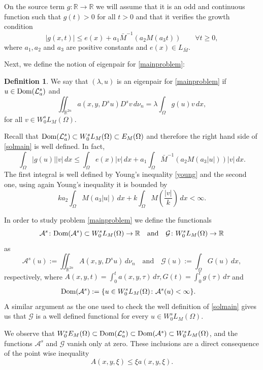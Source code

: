 \documentclass{amsart}
\def\Dom{\text{\normalfont Dom}}
\newcommand{\A}{\mathcal{L}_a^s}
\newcommand{\R}{{\mathbb R}}
\newcommand{\EE}{{\mathcal A}^s}
\newcommand{\G}{{\mathcal G}}
\theoremstyle{remark}
\theoremstyle{definition}
\newtheorem{defi}[teo]{Definition}
\numberwithin{equation}{section}
\begin{document}
On the source term $g\colon \R\to \R$ we will assume that it is an odd and continuous function such that $g(t)>0$ for all $t> 0$ and that it verifies the growth condition
\begin{equation}\label{condg}
|g(x, t)|\leq e(x) + a_1 \bar M^{-1}(a_2 M(a_3 t))\qquad \forall t\geq 0,
\end{equation}
where $a_1,a_2$ and $a_3$ are positive constants and $e(x)\in L_{\bar M}$. 

Next, we define the notion of eigenpair for \eqref{mainproblem}:
\begin{defi}
We say that $(\lambda,u)$ is an eigenpair for \eqref{mainproblem} if $u\in \Dom(\A)$ and
\begin{equation}\label{solmain}
\iint_{\R^{2n}}a(x,y,D^su)D^s v\,d\nu_n=\lambda \int_\Omega g(u)v\,dx,
\end{equation} 
for all $v\in W_0^s L_M(\Omega)$. 
\end{defi}

Recall that $\Dom(\A)\subset W^s_0L_M(\Omega)\subset E_M(\Omega)$ and therefore the right hand side of \eqref{solmain} is well defined. In fact,
$$
\int_\Omega |g(u)||v|\,dx\le \int_\Omega e(x)|v|\, dx + a_1\int_\Omega \bar M^{-1}(a_2 M(a_3 |u|))|v|\, dx.
$$
The first integral is well defined by Young's inequality \eqref{young} and the second one, using again Young's inequality it is bounded by
$$
ka_2\int_\Omega M(a_3 |u|)\, dx + k\int_\Omega M\left(\frac{|v|}{k}\right)\, dx <\infty. 
$$

In order to study problem \eqref{mainproblem} we define the functionals 
$$
\EE \colon \Dom(\EE)\subset W^s_0L_M(\Omega)\to \R \quad \text{and}\quad \mathcal{G}\colon W^s_0L_M(\Omega)\to \R
$$ 
as 
$$
\EE(u):=\iint_{\R^{2n}}A(x,y,D^s u)\,d\nu_n\quad \text{and}\quad \mathcal{G}(u):=\int_\Omega G(u)\,dx,
$$
respectively, where $A(x,y,t)=\int_0^t a(x,y,\tau)\, d\tau, G(t)=\int_0^t g(\tau)\, d\tau$ and
\begin{align*}
&\Dom(\EE):=\{u\in W_0^sL_M(\Omega)\colon  \EE(u)<\infty\}.
\end{align*}
A similar argument as the one used to check the well definition of \eqref{solmain} gives us that $\mathcal G$ is a well defined functional for every $u\in W^s_0L_M(\Omega)$.

We observe that $W_0^sE_M(\Omega)\subset \Dom(\A)\subset \Dom(\EE)\subset W_0^s L_M(\Omega)$, and the functions $\EE$ and $\G$ vanish only at zero. These inclusions are a direct consequence of the point wise inequality
$$
A(x, y, \xi)\le \xi a(x, y, \xi).
$$
\end{document}
